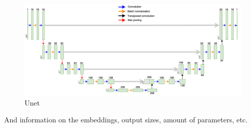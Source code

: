 \begin{figure}[htb]
	\begin{center}
		\includegraphics[width=\linewidth]{bilder/Unet.png}
		\caption{Unet}\label{fig:unet}
	\end{center}
\end{figure}
And information on the embeddings, output sizes, amount of parameters, etc.